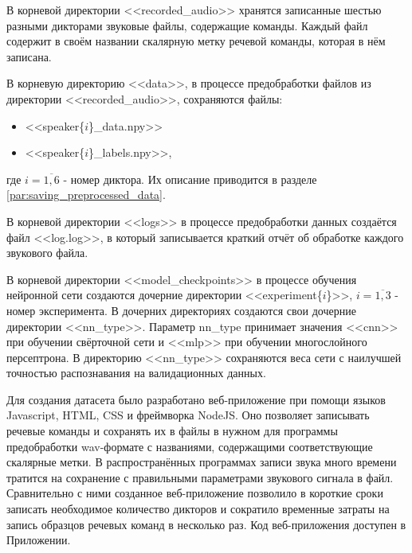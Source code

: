 В корневой директории <<recorded\_audio>> хранятся записанные шестью разными дикторами звуковые файлы, содержащие команды. Каждый файл содержит в своём названии скалярную метку речевой команды, которая в нём записана.

В корневую директорию <<data>>, в процессе предобработки файлов из директории <<recorded\_audio>>, сохраняются файлы:
\begin{itemize}[leftmargin=2cm]
	\item <<speaker\{$i$\}\_data.npy>>\footnotemark 
	\item <<speaker\{$i$\}\_labels.npy>>\footnotemark[\value{footnote}],
\end{itemize}
где  $i=\overline{1,6}$ - номер диктора. Их описание приводится в разделе \ref{par:saving_preprocessed_data}.

В корневой директории <<logs>> в процессе предобработки данных создаётся файл <<log.log>>, в который записывается краткий отчёт об обработке каждого звукового файла.

В корневой директории <<model\_checkpoints>> в процессе обучения нейронной сети создаются дочерние директории <<experiment\{$i$\}>>, $i=\overline{1,3}$ - номер эксперимента. В дочерних директориях создаются свои дочерние директории <<{nn\_type}>>. Параметр nn\_type принимает значения <<cnn>> при обучении свёрточной сети и <<mlp>> при обучении многослойного персептрона. В директорию <<{nn\_type}>> сохраняются веса сети с наилучшей точностью распознавания на валидационных данных.

Для создания датасета было разработано веб-приложение при помощи языков Javascript, HTML, CSS и фреймворка NodeJS. Оно позволяет записывать речевые команды и сохранять их в файлы в нужном для программы предобработки wav-формате с названиями, содержащими соответствующие скалярные метки. В распространённых программах записи звука много времени тратится на сохранение с правильными параметрами звукового сигнала в файл. Сравнительно с ними созданное веб-приложение позволило в короткие сроки записать необходимое количество дикторов и сократило временные затраты на запись образцов речевых команд в несколько раз. Код веб-приложения доступен в Приложении.

